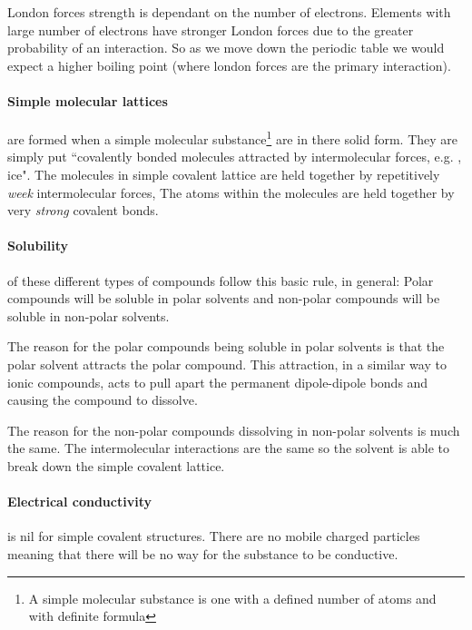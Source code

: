 	London forces strength is dependant on the number of electrons. Elements with large number of electrons have stronger London forces due to the greater probability of an interaction. So as we move down the periodic table we would expect a higher boiling point (where london forces are the primary interaction).
	
	\paragraph{Simple molecular lattices} are formed when a simple molecular substance\footnote{A simple molecular substance is one with a defined number of atoms and with definite formula} are in there solid form. They are simply put ``covalently bonded molecules attracted by intermolecular forces, e.g. , ice". The molecules in simple covalent lattice are held together by repetitively \textit{week} intermolecular forces, The atoms within the molecules are held together by very \textit{strong} covalent bonds.
	
	\paragraph{Solubility} of these different types of compounds follow this basic rule, in general: Polar compounds will be soluble in polar solvents and non-polar compounds will be soluble in non-polar solvents.
	
	The reason for the polar compounds being soluble in polar solvents is that the polar solvent attracts the polar compound. This attraction, in a similar way to ionic compounds, acts to pull apart the permanent dipole-dipole bonds and causing the compound to dissolve.
	
	The reason for the non-polar compounds dissolving in non-polar solvents is much the same. The intermolecular interactions are the same so the solvent is able to break down the simple covalent lattice.
	
	\paragraph{Electrical conductivity} is nil for simple covalent structures. There are no mobile charged particles meaning that there will be no way for the substance to be conductive.